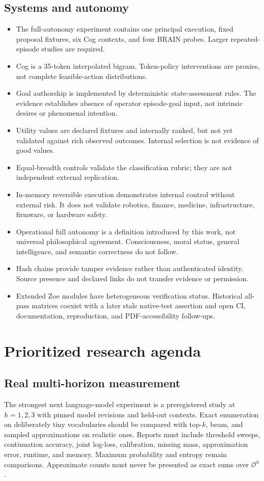 \subsection{Systems and autonomy}
\begin{itemize}
  \item The full-autonomy experiment contains one principal execution, fixed proposal fixtures, six Cog contexts, and four BRAIN probes. Larger repeated-episode studies are required.
  \item Cog is a 35-token interpolated bigram. Token-policy interventions are proxies, not complete feasible-action distributions.
  \item Goal authorship is implemented by deterministic state-assessment rules. The evidence establishes absence of operator episode-goal input, not intrinsic desires or phenomenal intention.
  \item Utility values are declared fixtures and internally ranked, but not yet validated against rich observed outcomes. Internal selection is not evidence of good values.
  \item Equal-breadth controls validate the classification rubric; they are not independent external replication.
  \item In-memory reversible execution demonstrates internal control without external risk. It does not validate robotics, finance, medicine, infrastructure, firmware, or hardware safety.
  \item Operational full autonomy is a definition introduced by this work, not universal philosophical agreement. Consciousness, moral status, general intelligence, and semantic correctness do not follow.
  \item Hash chains provide tamper evidence rather than authenticated identity. Source presence and declared links do not transfer evidence or permission.
  \item Extended Zoe modules have heterogeneous verification status. Historical all-pass matrices coexist with a later stale native-test assertion and open CI, documentation, reproduction, and PDF-accessibility follow-ups.
\end{itemize}

\section{Prioritized research agenda}
\subsection{Real multi-horizon measurement}
The strongest next language-model experiment is a preregistered study at $h=1,2,3$ with pinned model revisions and held-out contexts. Exact enumeration on deliberately tiny vocabularies should be compared with top-$k$, beam, and sampled approximations on realistic ones. Reports must include threshold sweeps, continuation accuracy, joint log-loss, calibration, missing mass, approximation error, runtime, and memory. Maximum probability and entropy remain comparisons. Approximate counts must never be presented as exact sums over $\mathcal O^h$.

